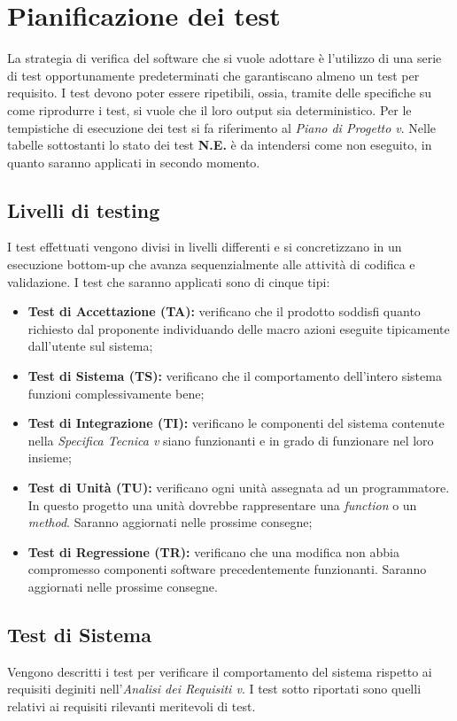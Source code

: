 \def\arraystretch{1.5}
\section{Pianificazione dei test}
La strategia di verifica del software che si vuole adottare è l'utilizzo di una serie di test opportunamente  predeterminati che garantiscano almeno un test per requisito. I test devono poter essere ripetibili, ossia, tramite delle specifiche su come riprodurre i test, si vuole che il loro output sia deterministico. Per le tempistiche di esecuzione dei test si fa riferimento al \emph{Piano di Progetto v}\VersionePP.
Nelle tabelle sottostanti lo stato dei test \textbf{N.E.} è da intendersi come non eseguito, in quanto saranno applicati in secondo momento.

\subsection{Livelli di testing}
I test effettuati vengono divisi in livelli differenti  e si concretizzano in un esecuzione bottom-up che avanza sequenzialmente alle attività di codifica e validazione. I test che saranno applicati sono di cinque tipi:
\begin{itemize}
\item \textbf{Test di Accettazione (TA): } verificano che il prodotto soddisfi quanto richiesto dal proponente individuando delle macro azioni eseguite tipicamente dall'utente sul sistema;
\item \textbf{Test di Sistema (TS): } verificano che il comportamento dell'intero sistema funzioni complessivamente bene;
\item \textbf{Test di Integrazione (TI): } verificano le componenti del sistema contenute nella \emph{Specifica Tecnica v}\VersioneST{} siano funzionanti e in grado di funzionare nel loro insieme;
\item \textbf{Test di Unità (TU): } verificano ogni unità assegnata ad un programmatore. In questo progetto una unità dovrebbe rappresentare una \emph{function} o un \emph{method}. Saranno aggiornati nelle prossime consegne;
\item \textbf{Test di Regressione (TR): } verificano che una modifica non abbia compromesso componenti software precedentemente funzionanti. Saranno aggiornati nelle prossime consegne.
\end{itemize}


\subsection{Test di Sistema}
Vengono descritti i test per verificare il comportamento del sistema rispetto ai requisiti deginiti nell'\emph{Analisi dei Requisiti v}\VersioneAR.
I test sotto riportati sono quelli relativi ai requisiti rilevanti meritevoli di test.

